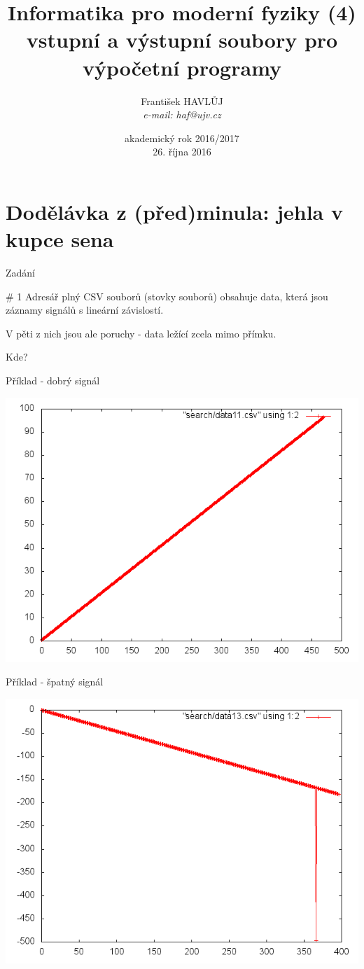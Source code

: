 \documentclass{beamer}
\title[IMF (4)]{Informatika pro moderní fyziky (4)\\vstupní a výstupní soubory pro výpočetní programy}
\author[Franti\v{s}ek HAVL\r{U}J, ORF ÚJV Řež]{Franti\v{s}ek HAVL\r{U}J\\{\scriptsize \emph{e-mail: haf@ujv.cz}}}
\date{akademický rok 2016/2017\\26. října 2016}
\institute[ORF ÚJV Řež]
{ÚJV Řež\\oddělení Reaktorové fyziky a podpory palivového cyklu}
\begin{document}
\begin{frame}
  \titlepage
\end{frame}

\begin{frame}
  \tableofcontents
\end{frame}

\section{Dodělávka z (před)minula: jehla v kupce sena}

\begin{frame}{Zadání}
  \begin{block}{\# 1}
    Adresář plný CSV souborů (stovky souborů) obsahuje data, která jsou záznamy signálů s lineární závislostí.

    V pěti z nich jsou ale poruchy - data ležící zcela mimo přímku.

    Kde?
  \end{block}
\end{frame}

\begin{frame}{Příklad - dobrý signál}
  \begin{center}
      \includegraphics[width=0.6\columnwidth]{search_good}
      \end{center}
\end{frame}
\begin{frame}{Příklad - špatný signál}
  \begin{center}
      \includegraphics[width=0.6\columnwidth]{search_bad}
      \end{center}
\end{frame}
\end{document}
